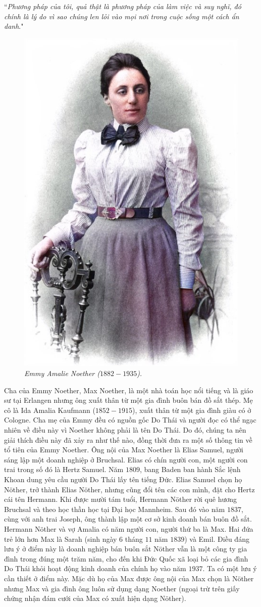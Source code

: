\vspace*{160pt}

	``\textit{Phương pháp của tôi, quả thật là phương pháp của làm việc và suy nghĩ, 
	đó chính là lý do vì sao chúng len lỏi vào mọi nơi trong cuộc sống một cách ẩn danh}."
\begin{multicols}{2}
		\begin{figure}[H]
		\centering
		\captionsetup{labelformat= empty, justification=centering}
		\includegraphics[width= 0.45\linewidth]{1a}
		\caption{\small\textit{\color{lichsutoanhoc}Emmy Amalie Noether ($1882-1935$).}}
		\vspace*{-10pt}
	\end{figure}
	Cha của Emmy Noether, Max Noether, là một nhà toán học nổi tiếng và là giáo sư tại Erlangen nhưng ông xuất thân từ một gia đình buôn bán đồ sắt thép. Mẹ cô là Ida Amalia Kaufmann ($1852-1915$), xuất thân từ một gia đình giàu có ở Cologne. Cha mẹ của Emmy đều có nguồn gốc Do Thái và người đọc có thể ngạc nhiên về điều này vì Noether không phải là tên Do Thái. Do đó, chúng ta nên giải thích điều này đã xảy ra như thế nào, đồng thời đưa ra một số thông tin về tổ tiên của Emmy Noether. Ông nội của Max Noether là Elias Samuel, người sáng lập một doanh nghiệp ở Bruchsal. Elias có chín người con,  một người con trai trong số đó là  Hertz Samuel. Năm $1809$, bang Baden ban hành Sắc lệnh Khoan dung yêu cầu người Do Thái lấy tên tiếng Đức. Elias Samuel chọn họ Nöther, trở thành Elias Nöther, nhưng cũng đổi tên các con mình, đặt cho Hertz cái tên Hermann. Khi được mười tám tuổi, Hermann Nöther rời quê hương Bruchsal và theo học thần học tại Đại học Mannheim. Sau đó vào năm $1837$, cùng với anh trai Joseph, ông thành lập một cơ sở kinh doanh bán buôn đồ sắt. Hermann Nöther và vợ Amalia có năm người con, người thứ ba là Max. Hai đứa trẻ lớn hơn Max là Sarah (sinh ngày $6$ tháng $11$ năm $1839$) và Emil. Điều đáng lưu ý ở điểm này là doanh nghiệp bán buôn sắt Nöther vẫn là một công ty gia đình trong đúng một trăm năm, cho đến khi Đức Quốc xã loại bỏ các gia đình Do Thái khỏi hoạt động kinh doanh của chính họ vào năm $1937$. Ta có một lưu ý cần thiết ở điểm này. Mặc dù họ của Max được ông nội của Max chọn là Nöther nhưng Max và gia đình ông  luôn sử dụng dạng Noether (ngoại trừ trên giấy chứng nhận đám cưới của Max có xuất hiện dạng Nöther).

\end{multicols}
